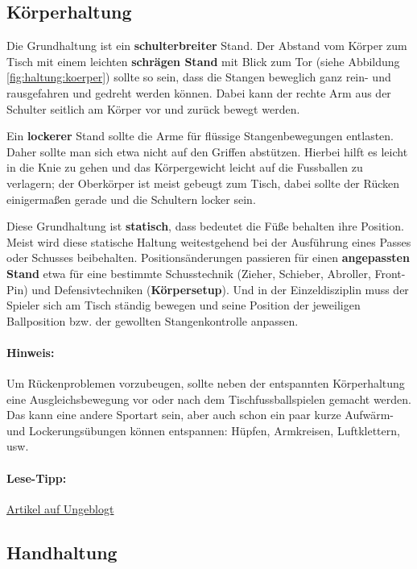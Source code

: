 \subsection{Körperhaltung}
\label{technik:haltung:koerper}

Die Grundhaltung ist ein \textbf{schulterbreiter} Stand.
Der Abstand vom Körper zum Tisch mit einem leichten \textbf{schrägen Stand} mit Blick zum Tor (siehe Abbildung \ref{fig:haltung:koerper}) sollte so sein, dass die Stangen beweglich ganz rein- und rausgefahren und gedreht werden können.
Dabei kann der rechte Arm aus der Schulter seitlich am Körper vor und zurück bewegt werden. 

Ein \textbf{lockerer} Stand sollte die Arme für flüssige Stangenbewegungen entlasten. 
Daher sollte man sich etwa nicht auf den Griffen abstützen.
Hierbei hilft es leicht in die Knie zu gehen und das Körpergewicht leicht auf die Fussballen zu verlagern; der Oberkörper ist meist gebeugt zum Tisch, dabei sollte der Rücken einigermaßen gerade und die Schultern locker sein.

Diese Grundhaltung ist \textbf{statisch}, dass bedeutet die Füße behalten ihre Position. 
Meist wird diese statische Haltung weitestgehend bei der Ausführung eines Passes oder Schusses beibehalten. 
Positionsänderungen passieren für einen \textbf{angepassten Stand} etwa für eine bestimmte Schusstechnik (Zieher, Schieber, Abroller, Front-Pin) und Defensivtechniken (\textbf{Körpersetup}).
Und in der Einzeldisziplin muss der Spieler sich am Tisch ständig bewegen und seine Position der jeweiligen Ballposition bzw. der gewollten Stangenkontrolle anpassen.

\paragraph{Hinweis:} Um Rückenproblemen vorzubeugen, sollte neben der entspannten Körperhaltung eine Ausgleichsbewegung vor oder nach dem Tischfussballspielen gemacht werden.
Das kann eine andere Sportart sein, aber auch schon ein paar kurze Aufwärm- und Lockerungsübungen können entspannen: Hüpfen, Armkreisen, Luftklettern, usw. 

\paragraph{Lese-Tipp:} \href{http://ungeblogtkickern.blogspot.de/2016/07/korperhaltung.html}{Artikel auf Ungeblogt}

\subsection{Handhaltung}
\label{technik:haltung:griffe}

